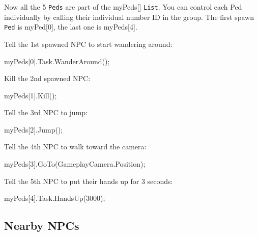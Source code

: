 \documentclass[
  openany]{book}
\newenvironment{Shaded}{\begin{snugshade}}{\end{snugshade}}
\newcommand{\DecValTok}[1]{\textcolor[rgb]{0.00,0.00,0.81}{#1}}
\newcommand{\FunctionTok}[1]{\textcolor[rgb]{0.00,0.00,0.00}{#1}}
\newcommand{\NormalTok}[1]{#1}
\begin{document}
Now all the 5 \texttt{Peds} are part of the myPeds{[}{]} \texttt{List}. You can control each Ped individually by calling their individual number ID in the group. The first spawn \texttt{Ped} is myPed{[}0{]}, the last one is myPeds{[}4{]}.

Tell the 1st spawned NPC to start wandering around:

\begin{Shaded}
\begin{Highlighting}[]
\NormalTok{myPeds[}\DecValTok{0}\NormalTok{].}\FunctionTok{Task}\NormalTok{.}\FunctionTok{WanderAround}\NormalTok{();}
\end{Highlighting}
\end{Shaded}

Kill the 2nd spawned NPC:

\begin{Shaded}
\begin{Highlighting}[]
\NormalTok{myPeds[}\DecValTok{1}\NormalTok{].}\FunctionTok{Kill}\NormalTok{();}
\end{Highlighting}
\end{Shaded}

Tell the 3rd NPC to jump:

\begin{Shaded}
\begin{Highlighting}[]
\NormalTok{myPeds[}\DecValTok{2}\NormalTok{].}\FunctionTok{Jump}\NormalTok{();}
\end{Highlighting}
\end{Shaded}

Tell the 4th NPC to walk toward the camera:

\begin{Shaded}
\begin{Highlighting}[]
\NormalTok{myPeds[}\DecValTok{3}\NormalTok{].}\FunctionTok{GoTo}\NormalTok{(GameplayCamera.}\FunctionTok{Position}\NormalTok{);}
\end{Highlighting}
\end{Shaded}

Tell the 5th NPC to put their hands up for 3 seconds:

\begin{Shaded}
\begin{Highlighting}[]
\NormalTok{myPeds[}\DecValTok{4}\NormalTok{].}\FunctionTok{Task}\NormalTok{.}\FunctionTok{HandsUp}\NormalTok{(}\DecValTok{3000}\NormalTok{);}
\end{Highlighting}
\end{Shaded}

\hypertarget{nearby-npcs}{%
\subsection*{Nearby NPCs}\label{nearby-npcs}}
\end{document}
